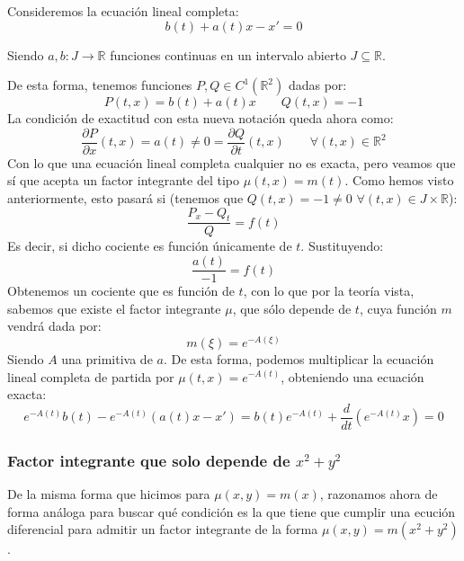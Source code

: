 \begin{ejemplo}
    Consideremos la ecuación lineal completa:
    \begin{equation*}
        b(t) + a(t)x - x' = 0
    \end{equation*}

    Siendo $a,b:J\rightarrow\mathbb{R}$ funciones continuas en un intervalo abierto $J\subseteq \mathbb{R}$.

    De esta forma, tenemos funciones $P,Q\in C^1(\mathbb{R}^2)$ dadas por:
    \begin{equation*}
        P(t,x) = b(t) + a(t)x \qquad Q(t,x) = -1
    \end{equation*}
    La condición de exactitud con esta nueva notación queda ahora como:
    \begin{equation*}
        \dfrac{\partial P}{\partial x}(t,x) = a(t) \neq 0 = \dfrac{\partial Q}{\partial t}(t,x) \qquad \forall (t,x)\in \mathbb{R}^2
    \end{equation*}
    Con lo que una ecuación lineal completa cualquier no es exacta, pero veamos que sí que acepta un factor integrante del tipo $\mu(t,x)=m(t)$. Como hemos visto anteriormente, esto pasará si (tenemos que $Q(t,x)=-1\neq 0$ $\forall (t,x)\in J\times \mathbb{R}$):
    \begin{equation*}
        \dfrac{P_x-Q_t}{Q} = f(t)
    \end{equation*}
    Es decir, si dicho cociente es función únicamente de $t$. Sustituyendo:
    \begin{equation*}
        \dfrac{a(t)}{-1} = f(t)
    \end{equation*}
    Obtenemos un cociente que es función de $t$, con lo que por la teoría vista, sabemos que existe el factor integrante $\mu$, que sólo depende de $t$, cuya función $m$ vendrá dada por:
    \begin{equation*}
        m(\xi) = e^{-A(\xi)}
    \end{equation*}
    Siendo $A$ una primitiva de $a$. De esta forma, podemos multiplicar la ecuación lineal completa de partida por $\mu(t,x) = e^{-A(t)}$, obteniendo una ecuación exacta:
    \begin{equation*}
        e^{-A(t)}b(t) - e^{-A(t)}(a(t)x - x') = b(t)e^{-A(t)} + \dfrac{d}{dt}\left(e^{-A(t)}x\right) = 0
    \end{equation*}
\end{ejemplo}

\subsubsection{Factor integrante que solo depende de $x^2+y^2$}
De la misma forma que hicimos para $\mu(x,y)=m(x)$, razonamos ahora de forma análoga para buscar qué condición es la que tiene que cumplir una ecución diferencial para admitir un factor integrante de la forma $\mu(x,y)=m(x^2+y^2)$.

